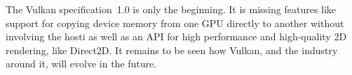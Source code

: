   The Vulkan specification~1.0 is only the beginning.
  It is missing features like support for copying device memory from one GPU directly to another without involving the hosti as well as an API for high performance and high-quality 2D rendering, like Direct2D.
  It remains to be seen how Vulkan, and the industry around it, will evolve in the future.
